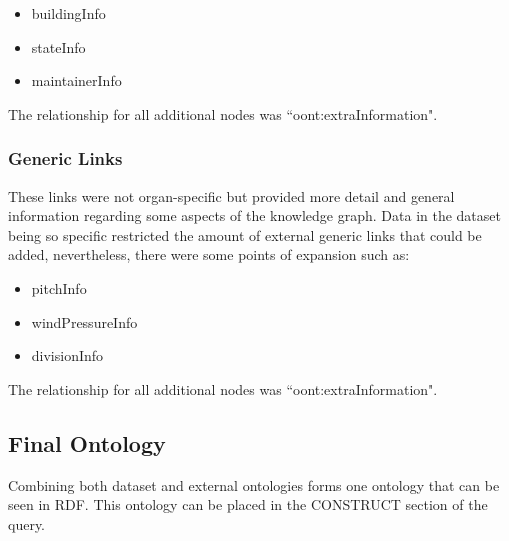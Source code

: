 \vspace{-0.15cm}
\begin{itemize}
    \itemsep0em 
    \vspace{-0.05cm}
    \item buildingInfo
    \vspace{-0.05cm}
    \item stateInfo
    \vspace{-0.05cm}
    \item maintainerInfo
    \vspace{-0.05cm}
\end{itemize}
\vspace{-0.1cm}

\noindent The relationship for all additional nodes was ``oont:extraInformation".

\subsubsection{Generic Links}
\hspace*{0.5cm} These links were not organ-specific but provided more detail and general information regarding some aspects of the knowledge graph. Data in the dataset being so specific restricted the amount of external generic links that could be added, nevertheless, there were some points of expansion such as:

\vspace{-0.15cm}
\begin{itemize}
    \itemsep0em 
    \vspace{-0.05cm}
    \item pitchInfo
    \vspace{-0.05cm}
    \item windPressureInfo
    \vspace{-0.05cm}
    \item divisionInfo
    \vspace{-0.1cm}
\end{itemize}
\vspace{-0.1cm}

\noindent The relationship for all additional nodes was ``oont:extraInformation".

\subsection{Final Ontology}
\hspace*{0.5cm} Combining both dataset and external ontologies forms one ontology that can be seen in RDF. This ontology can be placed in the CONSTRUCT section of the query.

